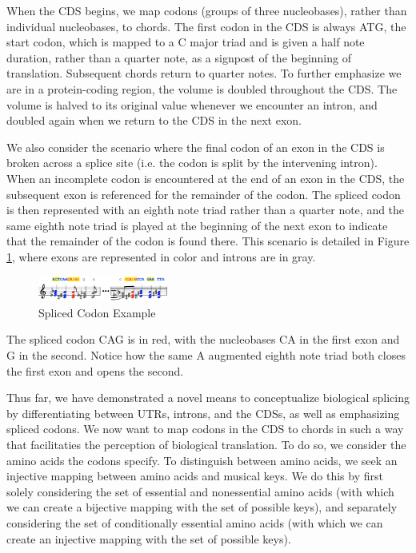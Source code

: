 \documentclass[letterpaper]{article}
\begin{document}
When the CDS begins, we map codons (groups of three nucleobases), rather than individual nucleobases, to chords. The first codon in the CDS is always ATG, the start codon, which is mapped to a C major triad and is given a half note duration, rather than a quarter note, as a signpost of the beginning of translation. Subsequent chords return to quarter notes. To further emphasize we are in a protein-coding region, the volume is doubled throughout the CDS. The volume is halved to its original value whenever we encounter an intron, and doubled again when we return to the CDS in the next exon. 

We also consider the scenario where the final codon of an exon in the CDS is broken across a splice site (i.e. the codon is split by the intervening intron). When an incomplete codon is encountered at the end of an exon in the CDS, the subsequent exon is referenced for the remainder of the codon. The spliced codon is then represented with an eighth note triad rather than a quarter note, and the same eighth note triad is played at the beginning of the next exon to indicate that the remainder of the codon is found there. This scenario is detailed in Figure \ref{fig:splice_site_example}, where exons are represented in color and introns are in gray. 

\begin{figure}[h!]
\centering
\includegraphics[width=0.38\textwidth]{images/splice_site_example}
  \caption{Spliced Codon Example}
  \label{fig:splice_site_example}
  \vspace{-3mm}
\end{figure}

The spliced codon CAG is in red, with the nucleobases CA in the first exon and G in the second. Notice how the same A augmented eighth note triad both closes the first exon and opens the second.

Thus far, we have demonstrated a novel means to conceptualize biological splicing by differentiating between UTRs, introns, and the CDSs, as well as emphasizing spliced codons. We now want to map codons in the CDS to chords in such a way that facilitaties the perception of biological translation. To do so,
we consider the amino acids the codons specify. To distinguish between amino acids, we seek an injective mapping between amino acids and musical keys. We do this by first solely considering the set of essential and nonessential amino acids (with which we can create a bijective mapping with the set of possible keys), and separately considering the set of conditionally essential amino acids (with which we can create an injective mapping with the set of possible keys).
\end{document}
